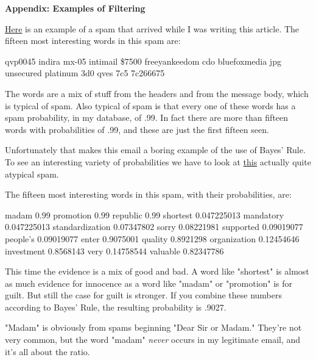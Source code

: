                     \textbf{Appendix: Examples of Filtering}

\href{https://sep.turbifycdn.com/ty/cdn/paulgraham/spam1.txt?t=1688221954\&}{Here}
                    is an example of a spam that arrived while I was writing
                    this article. The fifteen most interesting words in this
                    spam are:
                    
                      
qvp0045
indira
mx-05
intimail
\$7500
freeyankeedom
cdo
bluefoxmedia
jpg
unsecured
platinum
3d0
qves
7c5
7c266675

                    
                    The words are a mix of stuff from the headers and from the
                    message body, which is typical of spam. Also typical of spam
                    is that every one of these words has a spam probability, in
                    my database, of .99. In fact there are more than fifteen
                    words with probabilities of .99, and these are just the
                    first fifteen seen.

Unfortunately that makes this
                    email a boring example of the use of Bayes' Rule. To see an
                    interesting variety of probabilities we have to look at
                    \href{https://sep.turbifycdn.com/ty/cdn/paulgraham/spam2.txt?t=1688221954\&}{this}
                    actually quite atypical spam.

The fifteen most
                    interesting words in this spam, with their probabilities,
                    are:
                    
                      
madam           0.99
promotion       0.99
republic        0.99
shortest        0.047225013
mandatory       0.047225013
standardization 0.07347802
sorry           0.08221981
supported       0.09019077
people's        0.09019077
enter           0.9075001
quality         0.8921298
organization    0.12454646
investment      0.8568143
very            0.14758544
valuable        0.82347786 

                    
                    This time the evidence is a mix of good and bad. A word like
                    "shortest" is almost as much evidence for innocence as a
                    word like "madam" or "promotion" is for guilt. But still the
                    case for guilt is stronger. If you combine these numbers
                    according to Bayes' Rule, the resulting probability is
                    .9027.

"Madam" is obviously from spams beginning
                    "Dear Sir or Madam." They're not very common, but the word
                    "madam" \emph{never} occurs in my legitimate email, and it's
                    all about the ratio.


